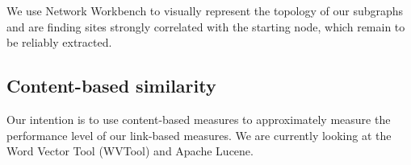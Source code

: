 \documentclass{article}
\begin{document}
We use Network Workbench to visually represent the topology of our
subgraphs and are finding sites strongly correlated with the starting
node, which remain to be reliably extracted.

\subsection{Content-based similarity}
Our intention is to use content-based measures to approximately
measure the performance level of our link-based measures. We are
currently looking at the Word Vector Tool (WVTool) and Apache Lucene.


\end{document}
